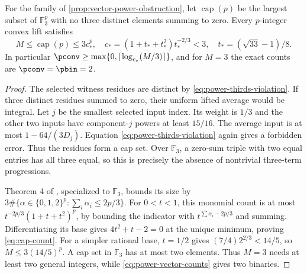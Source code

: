 \begin{proposition}\label{prop:cap-set}
For the family of \cref{prop:vector-power-obstruction}, let
$\operatorname{cap}(p)$ be the largest subset of $\mathbb F_3^p$ with
no three distinct elements summing to zero. Every $p$-integer convex
lift satisfies
\begin{equation}\label{eq:cap-count}
 M\le\operatorname{cap}(p)\le3c_*^p,
 \quad c_*=(1+t_*+t_*^2)t_*^{-2/3}<3,
 \quad t_*=(\sqrt{33}-1)/8.
\end{equation}
In particular $\pconv\ge\max\{0,\lceil\log_{c_*}(M/3)\rceil\}$,
and for $M=3$ the exact counts are $\pconv=\pbin=2$.
\end{proposition}
\begin{proof}
The selected witness residues are distinct by
\eqref{eq:power-thirds-violation}. If three distinct residues summed
to zero, their uniform lifted average would be integral. Let $j$ be
the smallest selected input index. Its weight is $1/3$ and the other
two inputs have component-$j$ powers at least $15/16$. The average
input is at most $1-64/(3D_j)$. Equation
\eqref{eq:power-thirds-violation} again gives a forbidden error.
Thus the residues form a cap set. Over $\mathbb F_3$, a zero-sum
triple with two equal entries has all three equal, so this is precisely
the absence of nontrivial three-term progressions.

Theorem 4 of \citet{ellenberg2017}, specialized to $\mathbb F_3$,
bounds its size by
$3\#\{\alpha\in\{0,1,2\}^p:\sum_i\alpha_i\le2p/3\}$.
For $0<t<1$, this monomial count is at most
$t^{-2p/3}(1+t+t^2)^p$, by bounding the indicator with
$t^{\sum\alpha_i-2p/3}$ and summing. Differentiating its base gives
$4t^2+t-2=0$ at the unique minimum, proving \eqref{eq:cap-count}.
For a simpler rational base, $t=1/2$ gives
$(7/4)2^{2/3}<14/5$, so $M\le3(14/5)^p$.
A cap set in $\mathbb F_3$ has at most two elements. Thus $M=3$
needs at least two general integers, while
\eqref{eq:power-vector-counts} gives two binaries.
\end{proof}

